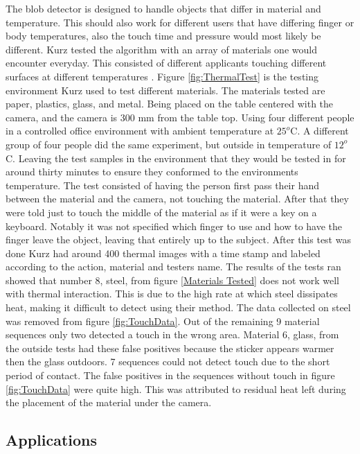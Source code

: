 \documentclass{sig-alternate}
\begin{document}
The blob detector is designed to handle objects that differ in material and temperature. This should also work for different users that have differing finger or body temperatures, also the touch time and pressure would most likely be different. Kurz tested the algorithm with an array of materials one would encounter everyday. This consisted of different applicants touching different surfaces at different temperatures \cite{3D}. Figure \ref{fig:ThermalTest} is the testing environment Kurz used to test different materials. The materials tested are paper, plastics, glass, and metal. Being placed on the table centered with the camera, and the camera is 300 mm from the table top. Using four different people in a controlled office environment with ambient temperature at \(25^o\)C. A different group of four people did the same experiment, but outside in temperature of \(12^o\)C. Leaving the test samples in the environment that they would be tested in for around thirty minutes to ensure they conformed to the environments temperature. The test consisted of having the person first pass their hand between the material and the camera, not touching the material. After that they were told just to touch the middle of the material as if it were a key on a keyboard. Notably it was not specified which finger to use and how to have the finger leave the object, leaving that entirely up to the subject. After this test was done Kurz had around 400 thermal images with a time stamp and labeled according to the action, material and testers name. The results of the tests ran showed that number 8, steel, from figure \ref{Materials Tested} does not work well with thermal interaction. This is due to the high rate at which steel dissipates heat, making it difficult to detect using their method. The data collected on steel was removed from figure \ref{fig:TouchData}. Out of the remaining 9 material sequences only two detected a touch in the wrong area. Material 6, glass, from the outside tests had these false positives because the sticker appears warmer then the glass outdoors. 7 sequences could not detect touch due to the short period of contact. The false positives in the sequences without touch in figure \ref{fig:TouchData} were quite high. This was attributed to residual heat left during the placement of the material under the camera. 
      

\subsection{Applications}
\label{Applications}
\end{document}
